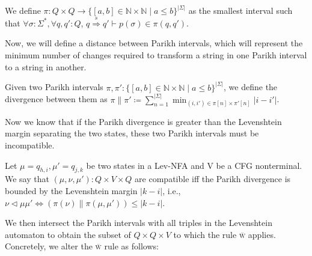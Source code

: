 \documentclass[sigplan,review,anonymous,acmsmall]{acmart}\settopmatter{printfolios=false,printccs=false,printacmref=false}
\begin{document}
  \begin{definition}
    We define $\pi: Q\times Q \rightarrow \{[a, b] \in \mathbb{N} \times \mathbb{N} \mid a \leq b\}^{|\Sigma|}$ as the smallest interval such that $\forall \sigma: \Sigma^*, \forall q, q': Q$, $q \overset{s}{\Longrightarrow} q' \vdash p(\sigma) \in \pi(q, q')$.
  \end{definition}

  Now, we will define a distance between Parikh intervals, which will represent the minimum number of changes required to transform a string in one Parikh interval to a string in another.

  \begin{definition}
    Given two Parikh intervals $\pi, \pi': \{[a, b] \in \mathbb{N} \times \mathbb{N} \mid a \leq b\}^{|\Sigma|}$, we define the divergence between them as $\pi \parallel \pi' \coloneqq \sum_{n=1}^{|\Sigma|} \min_{(i, i') \in \pi[n]\times \pi'[n]} |i - i'|$.
  \end{definition}

  Now we know that if the Parikh divergence is greater than the Levenshtein margin separating the two states, these two Parikh intervals must be incompatible.

  \begin{definition}
    Let $\mu=q_{h,i}, \mu' = q_{j,k}$ be two states in a Lev-NFA and V be a CFG nonterminal. We say that $(\mu, \nu, \mu'): Q\times V\times Q$ are compatible iff the Parikh divergence is bounded by the Levenshtein margin $|k-i|$, i.e., $\nu \lhd \mu\mu' \iff (\pi(\nu) \parallel \pi(\mu, \mu')) \leq |k-i|$.
  \end{definition}

  We then intersect the Parikh intervals with all triples in the Levenshtein automaton to obtain the subset of $Q\times Q \times V$ to which the rule \textsc{\"w} applies. Concretely, we alter the \textsc{\"w} rule as follows:

\begin{prooftree}
\end{prooftree}
\end{document}
